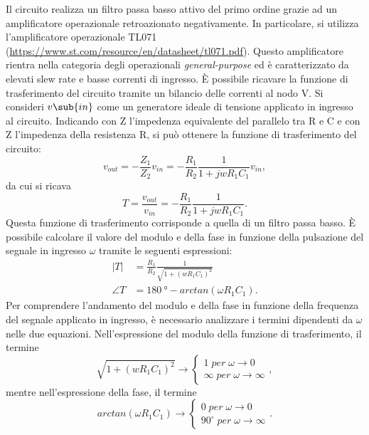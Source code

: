 \noindent
Il circuito realizza un filtro passa basso attivo del primo ordine grazie ad un amplificatore operazionale retroazionato negativamente. In particolare, si utilizza l'amplificatore operazionale TL071 (\url{https://www.st.com/resource/en/datasheet/tl071.pdf}). Questo amplificatore rientra nella categoria degli operazionali \textit{general-purpose} ed è caratterizzato da elevati slew rate e basse correnti di ingresso.
\`E possibile ricavare la funzione di trasferimento del circuito tramite un bilancio delle correnti al nodo V\super{-}. Si consideri $v\sub{in}$ come un generatore ideale di tensione applicato in ingresso al circuito. Indicando con Z l'impedenza equivalente del parallelo tra R e C e con Z l'impedenza della resistenza R, si può ottenere la funzione di trasferimento del circuito:
\begin{equation}
	v_{out}=-\frac{Z_1}{Z_2}v_{in}=-\frac{R_1}{R_2}\frac{1}{1+j w R_1 C_1} v_{in},
\end{equation}
da cui si ricava
\begin{equation}
	T=\frac{v_{out}}{v_{in}}=-\frac{R_1}{R_2}\frac{1}{1+j w R_1 C_1}.
\end{equation}
Questa funzione di trasferimento corrisponde a quella di un filtro passa basso. È possibile calcolare il valore del modulo e della fase in funzione della pulsazione del segnale in ingresso $\omega$ tramite le seguenti espressioni:
\begin{equation}
	\begin{split}
		|T|&=\frac{R_1}{R_2}\frac{1}{\sqrt{1+(wR_1C_1)^2}} \\
		\angle T&=\SI{180}{\degree}-arctan(\omega R_1 C_1).
	\end{split}
	\label{eq:1.3}
\end{equation}
Per comprendere l'andamento del modulo e della fase in funzione della frequenza del segnale applicato in ingresso, è necessario analizzare i termini dipendenti da $\omega$ nelle due equazioni. Nell'espressione del modulo della funzione di trasferimento, il termine 
\begin{equation}
	\sqrt{1+(wR_1C_1)^2} \to
	\begin{cases}
		1 \; per \; \omega \to 0 \\
		\infty \; per \; \omega \to \infty
	\end{cases}
,
\end{equation}
mentre nell'espressione della fase, il termine
\begin{equation}
	arctan(\omega R_1 C_1) \to
	\begin{cases}
		0 \; per \; \omega \to 0 \\
		90^\circ \; per \; \omega \to \infty
	\end{cases}
	.
\end{equation}
